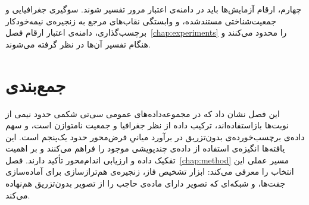 چهارم، ارقام آزمایش‌ها باید در دامنه‌ی اعتبار مرور تفسیر شوند. سوگیری جغرافیایی و جمعیت‌شناختی مستندشده، و وابستگی نقاب‌های مرجع به زنجیره‌ی نیمه‌خودکار برچسب‌گذاری، دامنه‌ی اعتبار ارقام فصل~\ref{chap:experiments} را محدود می‌کنند و هنگام تفسیر آن‌ها در نظر گرفته می‌شوند.

\section{جمع‌بندی}
\label{sec:s-summary}

این فصل نشان داد که در مجموعه‌داده‌های عمومی سی‌تی شکمی حدود نیمی از نوبت‌ها بازاستفاده‌اند، ترکیب داده از نظر جغرافیا و جمعیت نامتوازن است، و سهم داده‌ی برچسب‌خورده‌ی بدون‌تزریق در برآورد میانیِ فرض‌محور حدود یک‌پنجم است. این یافته‌ها انگیزه‌ی استفاده از داده‌ی چندپویشی موجود را فراهم می‌کنند و بر اهمیت تفکیک داده و ارزیابی اندام‌محور تأکید دارند. فصل~\ref{chap:method} مسیر عملی این انتخاب را معرفی می‌کند: ابزار تشخیص فاز، زنجیره‌ی هم‌ترازسازی برای آماده‌سازی جفت‌ها، و شبکه‌ای که تصویر دارای ماده‌ی حاجب را از تصویر بدون‌تزریق هم‌نهاده می‌کند.
